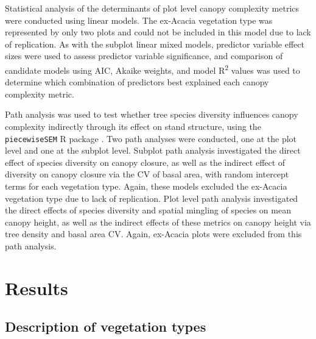 \begin{refsection}
Statistical analysis of the determinants of plot level canopy complexity metrics were conducted using linear models. The ex-Acacia vegetation type was represented by only two plots and could not be included in this model due to lack of replication. As with the subplot linear mixed models, predictor variable effect sizes were used to assess predictor variable significance, and comparison of candidate models using AIC, Akaike weights, and model R\textsuperscript{2} values was used to determine which combination of predictors best explained each canopy complexity metric.

Path analysis was used to test whether tree species diversity influences canopy complexity indirectly through its effect on stand structure, using the \texttt{piecewiseSEM} R package \citep{piecewiseSEM}. Two path analyses were conducted, one at the plot level and one at the subplot level. Subplot path analysis investigated the direct effect of species diversity on canopy closure, as well as the indirect effect of diversity on canopy closure via the CV of basal area, with random intercept terms for each vegetation type. Again, these models excluded the ex-Acacia vegetation type due to lack of replication. Plot level path analysis investigated the direct effects of species diversity and spatial mingling of species on mean canopy height, as well as the indirect effects of these metrics on canopy height via tree density and basal area CV. Again, ex-Acacia plots were excluded from this path analysis.




\begin{landscape}

\end{landscape}

\section{Results}
\label{tls:sec:results}

\subsection{Description of vegetation types}
\label{tls:ssec:veg_types}


\end{refsection}
